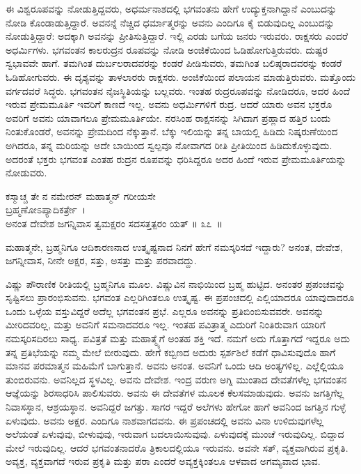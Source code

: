 ಈ ವಿಶ್ವರೂಪವನ್ನು ನೋಡುತ್ತಿದ್ದವರು, ಅಧರ್ಮನಾಶದಲ್ಲಿ ಭಗವಂತನು ಹೇಗೆ ಉದ್ಯುಕ್ತ\-ನಾಗಿದ್ದಾನೆ ಎಂಬುದನ್ನು ನೋಡಿ ಕೊಂಡಾಡುತ್ತಿದ್ದಾರೆ. ಅವನನ್ನೆ ನೆಚ್ಚಿದ ಧರ್ಮಾತ್ಮರನ್ನು ಅವನು ಎಂದಿಗೂ ಕೈ ಬಿಡುವುದಿಲ್ಲ ಎಂಬುದನ್ನು ನೋಡುತ್ತಿದ್ದಾರೆ: ಅದಕ್ಕಾಗಿ ಅವನನ್ನು ಪ್ರೀತಿಸುತ್ತಿದ್ದಾರೆ. ಇಲ್ಲಿ ಎರಡು ಬಗೆಯ ಜನರು ಇರುವರು. ರಾಕ್ಷಸರು ಎಂದರೆ ಅಧರ್ಮಿಗಳು. ಭಗವಂತನ ಕಾಲರುದ್ರನ ರೂಪವನ್ನು ನೋಡಿ ಅಂಜಿಕೆಯಿಂದ ಓಡಿಹೋಗುತ್ತಿರುವರು. ದುಷ್ಟರ ಸ್ವಭಾವವೇ ಹಾಗೆ. ತಮಗಿಂತ ದುರ್ಬಲರಾದವರನ್ನು ಕಂಡರೆ ಪೀಡಿಸುವರು, ತಮಗಿಂತ ಬಲಿಷ್ಠರಾದವರನ್ನು ಕಂಡರೆ ಓಡಿಹೋಗುವರು. ಈ ದೃಶ್ಯವನ್ನು ತಾಳಲಾರರು ರಾಕ್ಷಸರು. ಅಂಜಿಕೆಯಿಂದ ಪಲಾಯನ ಮಾಡುತ್ತಿರುವರು. ಮತ್ತೊಂದು ವರ್ಗದವರೆ ಸಿದ್ಧರು. ಭಗವಂತನ ನೈಜಸ್ಥಿತಿಯನ್ನು ಬಲ್ಲವರು. ಇಂತಹ ರುದ್ರರೂಪವನ್ನು ನೋಡಿದರೂ, ಅದರ ಹಿಂದೆ ಇರುವ ಪ್ರೇಮಮೂರ್ತಿ ಇವರಿಗೆ ಕಾಣದೆ ಇಲ್ಲ. ಅವನು ಅಧರ್ಮಿಗಳಿಗೆ ರುದ್ರ. ಆದರೆ ಯಾರು ಅವನ ಭಕ್ತರೊ ಅವರಿಗೆ ಅವನು ಯಾವಾಗಲೂ ಪ್ರೇಮಮೂರ್ತಿಯೇ. ನರಸಿಂಹ ರಾಕ್ಷಸನನ್ನು ಸಿಗಿದಾಗ ಪ್ರಹ್ಲಾದ ಹತ್ತಿರ ಬಂದು ನಿಂತುಕೊಂಡರೆ, ಅವನನ್ನು ಪ್ರೇಮದಿಂದ ನೆಕ್ಕುತ್ತಾನೆ. ಬೆಕ್ಕು ಇಲಿಯನ್ನು ತನ್ನ ಬಾಯಲ್ಲಿ ಹಿಡಿದು ನಿಷ್ಕರುಣೆಯಿಂದ ಅಗಿದರೂ, ತನ್ನ ಮರಿಯನ್ನು ಅದೇ ಬಾಯಿಂದ ಸ್ವಲ್ಪವೂ ನೋವಾಗದ ರೀತಿ ಪ್ರೀತಿಯಿಂದ ಹಿಡಿದುಕೊಳ್ಳುವುದು. ಅದರಂತೆ ಭಕ್ತರು ಭಗವಂತ ಎಂತಹ ರುದ್ರನ ರೂಪವನ್ನು ಧರಿಸಿದ್ದರೂ ಅದರ ಹಿಂದೆ ಇರುವ ಪ್ರೇಮಮೂರ್ತಿಯನ್ನು ನೋಡುವರು.

\begin{shloka}
ಕಸ್ಮಾಚ್ಚ ತೇ ನ ನಮೇರನ್ ಮಹಾತ್ಮನ್ ಗರೀಯಸೇ\\ ಬ್ರಹ್ಮಣೋಽಪ್ಯಾದಿಕರ್ತ್ರೇ~।\\ಅನಂತ ದೇವೇಶ ಜಗನ್ನಿವಾಸ ತ್ವಮಕ್ಷರಂ ಸದಸತ್ತತ್ಪರಂ ಯತ್ \hfill॥ ೩೭~॥
\end{shloka}

\begin{artha}
ಮಹಾತ್ಮನೇ, ಬ್ರಹ್ಮನಿಗೂ ಆದಿಕಾರಣನಾದ ಉತ್ಕೃಷ್ಟನಾದ ನಿನಗೆ ಹೇಗೆ ನಮಸ್ಕರಿಸದೆ ಇದ್ದಾರು? ಅನಂತ, ದೇವೇಶ, ಜಗನ್ನೀವಾಸ, ನೀನೇ ಅಕ್ಷರ, ಸತ್ತು, ಅಸತ್ತು ಮತ್ತು ಪರವಾದದ್ದು.
\end{artha}

ವಿಷ್ಣು ಪೌರಾಣಿಕ ರೀತಿಯಲ್ಲಿ ಬ್ರಹ್ಮನಿಗೂ ಮೂಲ. ವಿಷ್ಣುವಿನ ನಾಭಿಯಿಂದ ಬ್ರಹ್ಮ ಹುಟ್ಟಿದ. ಅನಂತರ ಪ್ರಪಂಚವನ್ನು ಸೃಷ್ಟಿಸಲು ಪ್ರಾರಂಭಿಸುವನು. ಭಗವಂತ ಎಲ್ಲರಿಗಿಂತಲೂ ಉತ್ಕೃಷ್ಟ. ಈ ಪ್ರಪಂಚದಲ್ಲಿ ಎಲ್ಲಿಯಾದರೂ ಯಾವುದಾದರೂ ಒಂದು ಒಳ್ಳೆಯ ವಸ್ತುವಿದ್ದರೆ ಅದೆಲ್ಲ ಭಗವಂತನ ಪ್ರಭೆ. ಎಲ್ಲರೂ ಅವನನ್ನು ಪ್ರತಿಬಿಂಬಿಸುವವರೇ. ಅವನನ್ನು ಮೀರಿದವರಿಲ್ಲ, ಮತ್ತು ಅವನಿಗೆ ಸಮನಾದವರೂ ಇಲ್ಲ. ಇಂತಹ ಪವಿತ್ರಾತ್ಮ ಎದುರಿಗೆ ನಿಂತಿರುವಾಗ ಯಾರಿಗೆ ನಮಸ್ಕರಿಸದಿರಲು ಸಾಧ್ಯ. ಪವಿತ್ರತೆ ಮತ್ತು ಮಹಾತ್ಮ್ಯೆಗೆ ಅಂತಹ ಶಕ್ತಿ ಇದೆ. ನಮಗೆ ಅದು ಗೊತ್ತಾಗದೆ ಇದ್ದರೂ ಅದು ತನ್ನ ಪ್ರತಿಭೆಯನ್ನು ನಮ್ಮ ಮೇಲೆ ಬೀರುವುದು. ಹೇಗೆ ಕಬ್ಬಿಣದ ಅದುರು ಸ್ಪರ್ಶಶಿಲೆ ಕಡೆಗೆ ಧಾವಿಸುವುದೊ ಹಾಗೆ ಮಾನವ ಪರಮಾತ್ಮನ ಮಹಿಮೆಗೆ ಬಾಗುತ್ತಾನೆ. ಅವನು ಅನಂತ. ಅವನಿಗೆ ಒಂದು ಆದಿ ಅಂತ್ಯಗಳಿಲ್ಲ. ಎಲ್ಲೆಲ್ಲಿಯೂ ತುಂಬಿರುವನು. ಅವನಿಲ್ಲದ ಸ್ಥಳವಿಲ್ಲ. ಅವನು ದೇವೇಶ. ಇಂದ್ರ ವರುಣ ಅಗ್ನಿ ಮುಂತಾದ ದೇವತೆಗಳೆಲ್ಲ ಭಗವಂತನ ಆಜ್ಞೆಯನ್ನು ಶಿರಸಾಧರಿಸಿ ಪಾಲಿಸುವರು. ಅವನು ಈ ದೇವತೆಗಳ ಮೂಲಕ ಕೆಲಸಮಾಡುವುದು. ಅವನು ಜಗತ್ತಿಗೆಲ್ಲ ನಿವಾಸಸ್ಥಾನ, ಆಶ್ರಯಸ್ಥಾನ. ಅವನಿದ್ದರೆ ಜಗತ್ತು. ಸಾಗರ ಇದ್ದರೆ ಅಲೆಗಳು ಹೇಗೋ ಹಾಗೆ ಅವನಿಂದ ಜಗತ್ತಿನ ಗುಳ್ಳೆ ಏಳುವುದು. ಅವನು ಅಕ್ಷರ. ಎಂದಿಗೂ ನಾಶವಾಗದವನು. ಈ ಪ್ರಪಂಚದಲ್ಲಿ ಅವನು ವಿನಾ ಉಳಿದುವುಗಳೆಲ್ಲ ಅಲೆಯಂತೆ ಏಳುವುವು, ಬೀಳುವುವು, ಇರುವಾಗ ಬದಲಾಯಿಸುವುವು. ಏಳುವುದಕ್ಕೆ ಮುಂಚೆ ಇರುವುದಿಲ್ಲ. ಬಿದ್ದಾದ ಮೇಲೆ ಇರುವುದಿಲ್ಲ. ಆದರೆ ಭಗವಂತನಾದರೊ ತ್ರಿಕಾಲದಲ್ಲಿಯೂ ಇರುವನು. ಅವನೇ ಸತ್, ವ್ಯಕ್ತವಾಗಿರುವ ಪ್ರಕೃತಿ. ಅವ್ಯಕ್ತ, ವ್ಯಕ್ತವಾಗದೆ ಇರುವ ಪ್ರಕೃತಿ ಮತ್ತು ಪರಾ ಎಂದರೆ ಅವ್ಯಕ್ತಕ್ಕಿಂತಲೂ ಆಳವಾದ ಅಗಮ್ಯವಾದ ಭಾವ.

